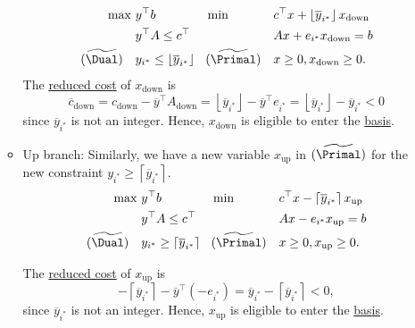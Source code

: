\begin{remark}
\begin{itemize}
\begin{itemize}
\[\begin{alignedat}{5}
					            \max ~                   & y^{\top}b\qquad\qquad                                               &  & \min~                      &  & c^{\top}x+\left\lfloor \overline{y}_{i^{\ast}} \right\rfloor x_{\text{down}} \\
					                                     & y^{\top}A\leq c^{\top}                                              &  &                            &  & Ax + e_{i^{\ast}}x_{\text{down}} = b                                         \\
					            (\widetilde{\Dual})\quad & y_{i^{\ast}}\leq \left\lfloor \overline{y}_{i^{\ast}} \right\rfloor &  & (\widetilde{\Primal})\quad &  & x\geq 0, x_{\text{down}}\geq 0.
				            \end{alignedat}
			            \]
			            The \hyperref[def:reduced-cost]{reduced cost} of \(x_{\text{down}}\) is
			            \[
				            \overline{c}_{\text{down}}=c_{\text{down}}-\overline{y}^{\top}A_{\text{down}} = \left\lfloor \overline{y}_{i^{\ast}} \right\rfloor - \overline{y}^{\top}e_{i^{\ast}} = \left\lfloor \overline{y}_{i^{\ast}} \right\rfloor - \overline{y}_{i^{\ast}} < 0
			            \]
			            since \(\overline{y} _{i^{\ast} }\) is not an integer. Hence, \(x_{\text{down}}\) is eligible to enter the \hyperref[def:basis]{basis}.
			      \item\label{rmk:up-branch} Up branch: Similarly, we have a new variable \(x_{\text{up}}\) in \((\widetilde{\Primal})\) for the new constraint \(y_{i^{\ast}} \geq \left\lceil \overline{y} _{i^{\ast}} \right\rceil \).
			            \[
				            \begin{alignedat}{5}
					            \max ~                   & y^{\top}b\qquad\qquad                                               &  & \min~                      &  & c^{\top}x - \left\lceil \overline{y}_{i^{\ast}} \right\rceil x_{\text{up}} \\
					                                     & y^{\top}A\leq c^{\top}                                              &  &                            &  & Ax - e_{i^{\ast}} x_{\text{up}}= b                                         \\
					            (\widetilde{\Dual})\quad & y_{i^{\ast}} \geq \left\lceil \overline{y} _{i^{\ast}} \right\rceil &  & (\widetilde{\Primal})\quad &  & x\geq 0, x_{\text{up}}\geq 0.
				            \end{alignedat}
			            \]

			            The \hyperref[def:reduced-cost]{reduced cost} of \(x_{\text{up}}\) is
			            \[
				            -\left\lceil \overline{y}_{i^{\ast}} \right\rceil - \overline{y}^{\top}(-e_{i^{\ast}}) = \overline{y}_{i^{\ast}} - \left\lceil \overline{y}_{i^{\ast}} \right\rceil < 0,
			            \]
			            since \(\overline{y} _{i^{\ast} }\) is not an integer. Hence, \(x_{\text{up}}\) is eligible to enter the \hyperref[def:basis]{basis}.
		      \end{itemize}
	\end{itemize}
\end{remark}

